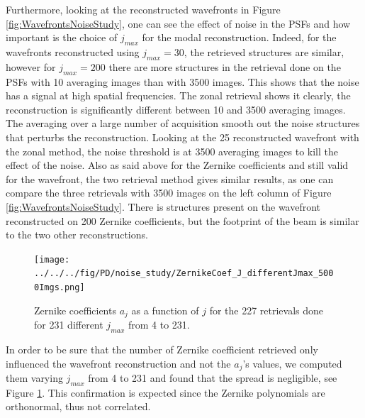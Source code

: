 Furthermore, looking at the reconstructed wavefronts in Figure \ref{fig:WavefrontsNoiseStudy}, one can see the effect of noise in the PSFs and how important is the choice of $j_{max}$ for the modal reconstruction. Indeed, for the wavefronts reconstructed using $j_{max}=30$, the retrieved structures are similar, however for $j_{max}=200$ there are more structures in the retrieval done on the PSFs with 10 averaging images than with 3500 images. This shows that the noise has a signal at high spatial frequencies. The zonal retrieval shows it clearly, the reconstruction is significantly different between 10 and 3500 averaging images. The averaging over a large number of acquisition smooth out the noise structures that perturbs the reconstruction. Looking at the 25 reconstructed wavefront with the zonal method, the noise threshold is at 3500 averaging images to kill the effect of the noise. Also as said above for the Zernike coefficients and still valid for the wavefront, the two retrieval method gives similar results, as one can compare the three retrievals with 3500 images on the left column of Figure \ref{fig:WavefrontsNoiseStudy}. There is structures present on the wavefront reconstructed on 200 Zernike coefficients, but the footprint of the beam is similar to the two other reconstructions.


\begin{figure}
\begin{center}
\texttt{[image: ../../../fig/PD/noise\_study/ZernikeCoef\_J\_differentJmax\_5000Imgs.png]}
\decoRule
\caption{Zernike coefficients $a_j$ as a function of $j$ for the 227 retrievals done for 231 different $j_{max}$ from 4 to 231.}
\label{fig:ZernikeCoef_J_differentJmax_5000Imgs}
\end{center}
\end{figure}

In order to be sure that the number of Zernike coefficient retrieved only influenced the wavefront reconstruction and not the $a_j$'s values, we computed them varying $j_{max}$ from 4 to 231 and found that the spread is negligible, see Figure \ref{fig:ZernikeCoef_J_differentJmax_5000Imgs}. This confirmation is expected since the Zernike polynomials are orthonormal, thus not correlated.

